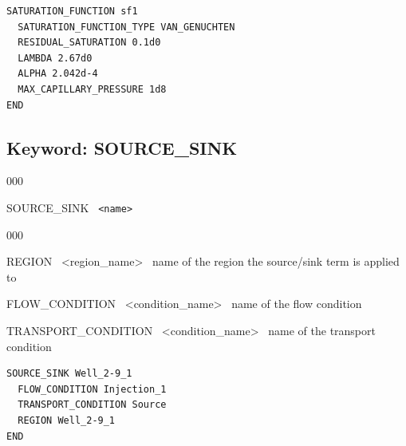 
\begin{mdframed}

\footnotesize
\begin{verbatim}
SATURATION_FUNCTION sf1
  SATURATION_FUNCTION_TYPE VAN_GENUCHTEN
  RESIDUAL_SATURATION 0.1d0
  LAMBDA 2.67d0
  ALPHA 2.042d-4
  MAX_CAPILLARY_PRESSURE 1d8
END
\end{verbatim}
\normalsize
\end{mdframed}

\hyperlink{target_key}{\return}


\newpage
\protect\hypertarget{target_src}{}

\subsection{Keyword: SOURCE\_SINK}

\hfill\hyperlink{target_key}{\return}

\begin{deflist}{000}
\item[SOURCE\_SINK] \ {\tt <name>}
\begin{deflist}{000}
\item[REGION] \ <region\_name> \ name of the region the source/sink term is applied to
\item[FLOW\_CONDITION] \ <condition\_name> \ name of the flow condition
\item[TRANSPORT\_CONDITION] \ <condition\_name> \ name of the transport condition
\end{deflist}
\item[\keyend]
\end{deflist}

\begin{mdframed}

\footnotesize
\begin{verbatim}
SOURCE_SINK Well_2-9_1
  FLOW_CONDITION Injection_1
  TRANSPORT_CONDITION Source
  REGION Well_2-9_1
END
\end{verbatim}
\normalsize
\end{mdframed}

\hyperlink{target_key}{\return}


\newpage
\protect\hypertarget{target_strata}{}

